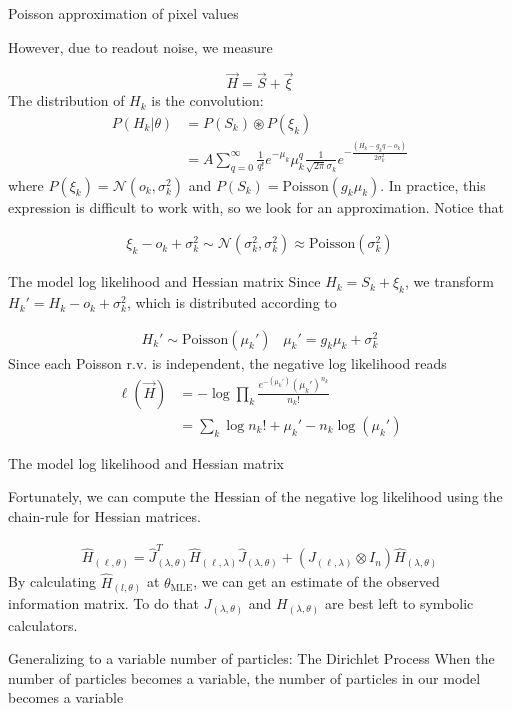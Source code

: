 \documentclass[aspectratio=169]{beamer}
\begin{document}
\begin{frame}{Poisson approximation of pixel values}

However, due to readout noise, we measure

\begin{equation*}
\vec{H} = \vec{S} + \vec{\xi}
\end{equation*}
The distribution of $H_{k}$ is the convolution:
\begin{align*}
P(H_{k}|\theta) &= P(S_{k})\circledast P(\xi_{k})\\
&= A\sum_{q=0}^{\infty} \frac{1}{q!}e^{-\mu_{k}}\mu_{k}^{q}\frac{1}{\sqrt{2\pi}\sigma_{k}}e^{-\frac{(H_{k}-g_{k}q-o_{k})}{2\sigma_{k}^{2}}}
\end{align*}
where $P(\xi_{k}) = \mathcal{N}(o_{k},\sigma_{k}^{2})$ and $P(S_{k}) = \mathrm{Poisson}(g_{k}\mu_{k})$. In practice, this expression is difficult to work with, so we look for an approximation. Notice that 

\begin{align*}
\xi_{k} - o_{k} + \sigma_{k}^{2} \sim \mathcal{N}(\sigma_{k}^{2},\sigma_{k}^{2}) \approx \mathrm{Poisson}(\sigma_{k}^{2})
\end{align*}

\end{frame}

\begin{frame}{The model log likelihood and Hessian matrix}
Since $H_{k} = S_{k} + \xi_{k}$, we transform $H_{k}' = H_{k} - o_{k} + \sigma_{k}^{2}$, which is distributed according to 

\begin{align*}
H_{k}' \sim \mathrm{Poisson}(\mu_{k}')\;\;\;\mu_{k}' = g_{k}\mu_{k} + \sigma_{k}^{2}
\end{align*}
Since each Poisson r.v. is independent, the negative log likelihood reads
\begin{align*}
\ell(\vec{H}) &= -\log \prod_{k} \frac{e^{-\left(\mu_{k}'\right)}\left(\mu_{k}'\right)^{n_{k}}}{n_{k}!}\\
&= \sum_{k}  \log n_{k}! + \mu_{k}' - n_{k}\log\left(\mu_{k}'\right)
\end{align*}

\end{frame}

\begin{frame}{The model log likelihood and Hessian matrix}

Fortunately, we can compute the Hessian of the negative log likelihood using the chain-rule for Hessian matrices.

\begin{align*}
\hat{H}_{(\ell,\theta)} = \hat{J}_{(\lambda,\theta)}^{T} \hat{H}_{(\ell,\lambda)} \hat{J}_{(\lambda,\theta)} + (J_{(\ell,\lambda)}\otimes I_{n})\hat{H}_{(\lambda,\theta)}
\end{align*}
By calculating $\hat{H}_{(l,\theta)}$ at $\theta_{\mathrm{MLE}}$, we can get an estimate of the observed information matrix. To do that $J_{(\lambda,\theta)}$ and $H_{(\lambda,\theta)}$ are best left to symbolic calculators. 
\end{frame}

\begin{frame}{Generalizing to a variable number of particles: The Dirichlet Process}
When the number of particles becomes a variable, the number of particles in our model becomes a variable
 
\end{frame}
\end{document}
